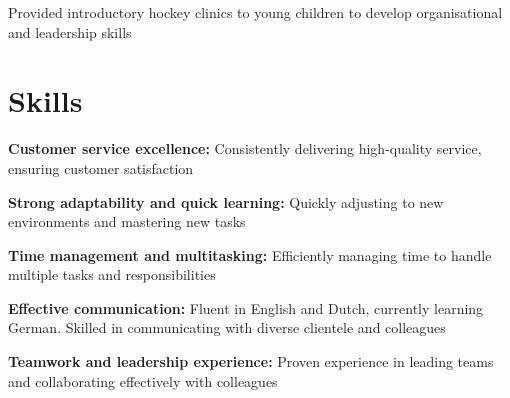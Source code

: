	\vspace{0.10 cm}
	\begin{onecolentry}
		\begin{highlights}
			\item Provided introductory hockey clinics to young children to develop organisational and leadership skills
		\end{highlights}
	\end{onecolentry}
	
	\section{Skills}
	
	\begin{onecolentry}
		\textbf{Customer service excellence:} Consistently delivering high-quality service, ensuring customer satisfaction
	\end{onecolentry}
	
	\vspace{0.2 cm}
	
	\begin{onecolentry}
		\textbf{Strong adaptability and quick learning:} Quickly adjusting to new environments and mastering new tasks
	\end{onecolentry}
	
	\vspace{0.2 cm}
	
	\begin{onecolentry}
		\textbf{Time management and multitasking:} Efficiently managing time to handle multiple tasks and responsibilities
	\end{onecolentry}
	
	\vspace{0.2 cm}
	
	\begin{onecolentry}
		\textbf{Effective communication:} Fluent in English and Dutch, currently learning German. Skilled in communicating with diverse clientele and colleagues
	\end{onecolentry}
	
	\vspace{0.2 cm}
	
	\begin{onecolentry}
		\textbf{Teamwork and leadership experience:} Proven experience in leading teams and collaborating effectively with colleagues
	\end{onecolentry}
	
	\vspace{0.2 cm}
	
